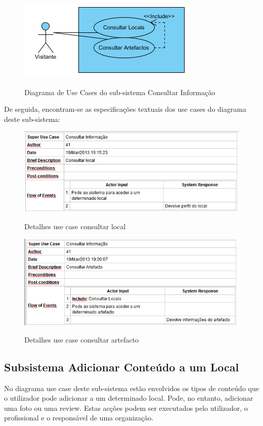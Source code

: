 ﻿\documentclass[12pt,a4paper]{article}
\begin{document}
\begin{figure}[h!]
\centering
\includegraphics[scale=1]{usecase/V_ConsultarInformaccao}
\label{usecase}
\caption{Diagrama de Use Cases do sub-sistema Consultar Informação}
\end{figure}

De seguida, encontram-se as especificações textuais dos use cases do diagrama deste sub-sistema:\\


\begin{figure}[h!]
\centering
\includegraphics[scale=0.7]{d_usecase/consultarlocais}
\label{usecase}
\caption{Detalhes use case consultar local}
\end{figure}


\begin{figure}[h!]
\centering
\includegraphics[scale=0.7]{d_usecase/consultarartefacto}
\label{usecase}
\caption{Detalhes use case consultar artefacto}
\end{figure}

\subsection{Subsistema Adicionar Conteúdo a um Local}
No diagrama use case deste sub-sistema estão envolvidos os tipos de conteúdo que o utilizador pode adicionar a um determinado local. Pode, no entanto, adicionar uma foto ou uma review. Estas acções podem ser executados pelo utilizador, o profissional e o responsável de uma organização.\\
\end{document}

